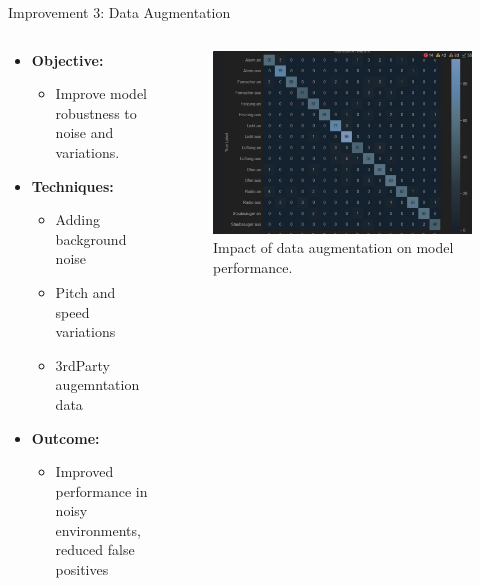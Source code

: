 \documentclass{beamer}
\begin{document}
\begin{frame}{Improvement 3: Data Augmentation}
  \begin{columns}
    \begin{column}{0.5\textwidth}
      \begin{itemize}
        \item \textbf{Objective:}
            \begin{itemize}
            \item Improve model robustness to noise and variations.
            \end{itemize}
        \item \textbf{Techniques:}
          \begin{itemize}
            \item Adding background noise
            \item Pitch and speed variations
            \item 3rdParty augemntation data
          \end{itemize}
        \item \textbf{Outcome:}
          \begin{itemize}
            \item Improved performance in noisy environments, reduced false positives
          \end{itemize}
      \end{itemize}
    \end{column}
    \begin{column}{0.5\textwidth}
      \begin{figure}
        \includegraphics[width=\textwidth]{fig/tuned_heatmap.jpeg}
        \caption{Impact of data augmentation on model performance.}
      \end{figure}
    \end{column}
  \end{columns}
\end{frame}
\end{document}
